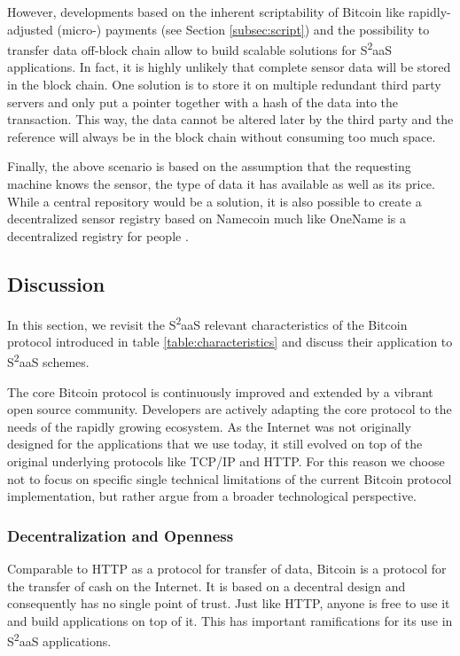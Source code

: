 However, developments based on the inherent scriptability of Bitcoin like rapidly-adjusted (micro-) payments (see Section \ref{subsec:script}) and the possibility to transfer data off-block chain allow to build scalable solutions for S\textsuperscript{2}aaS applications. In fact, it is highly unlikely that complete sensor data will be stored in the block chain. One solution is to store it on multiple redundant third party servers and only put a pointer together with a hash of the data into the transaction. This way, the data cannot be altered later by the third party and the reference will always be in the block chain without consuming too much space.

Finally, the above scenario is based on the assumption that the requesting machine knows the sensor, the type of data it has available as well as its price. While a central repository would be a solution, it is also possible to create a decentralized sensor registry based on Namecoin much like OneName is a decentralized registry for people \cite{onename.io}.

\subsection{Discussion}
\label{sec:discussion}

In this section, we revisit the S\textsuperscript{2}aaS relevant characteristics of the Bitcoin protocol introduced in table \ref{table:characteristics} and discuss their application to S\textsuperscript{2}aaS schemes. 

The core Bitcoin protocol is continuously improved and extended by a vibrant open source community. Developers are actively adapting the core protocol to the needs of the rapidly growing ecosystem. As the Internet was not originally designed for the applications that we use today, it still evolved on top of the original underlying protocols like TCP/IP and HTTP. For this reason we choose not to focus on specific single technical limitations of the current Bitcoin protocol implementation, but rather argue from a broader technological perspective.

\subsubsection{Decentralization and Openness}

Comparable to HTTP as a protocol for transfer of data, Bitcoin is a protocol for the transfer of cash on the Internet. It is based on a decentral design and consequently has no single point of trust. Just like HTTP, anyone is free to use it and build applications on top of it. This has important ramifications for its use in S\textsuperscript{2}aaS applications.

